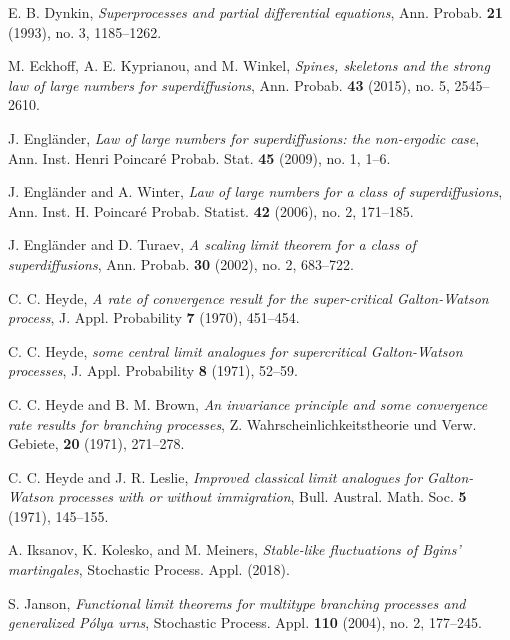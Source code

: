 \documentclass[12pt,a4paper]{amsart}
\theoremstyle{plain}
\theoremstyle{definition}
\numberwithin{equation}{section}
\begin{document}
\begin{thebibliography}{10}
  E. B. Dynkin,
  \emph{Superprocesses and partial differential equations},
  Ann. Probab. \textbf{21} (1993), no. 3, 1185--1262.

  M. Eckhoff, A. E. Kyprianou, and M. Winkel,
  \emph{Spines, skeletons and the strong law of large numbers for superdiffusions},
  Ann. Probab. \textbf{43} (2015), no. 5, 2545--2610.

  J. Engl\"{a}nder,
  \emph{Law of large numbers for superdiffusions: the non-ergodic case},
  Ann. Inst. Henri Poincar\'{e} Probab. Stat. \textbf{45} (2009), no. 1, 1--6.

  J. Engl\"{a}nder and A. Winter,
  \emph{Law of large numbers for a class of superdiffusions},
  Ann. Inst. H. Poincar\'{e} Probab. Statist. \textbf{42} (2006), no. 2, 171--185.

  J. Engl\"{a}nder and  D. Turaev,
  \emph{A scaling limit theorem for a class of superdiffusions},
  Ann. Probab. \textbf{30} (2002), no. 2, 683--722.

  C. C. Heyde,
  \emph{A rate of convergence result for the super-critical {G}alton-{W}atson process},
  J. Appl. Probability \textbf{7} (1970), 451--454.

  C. C. Heyde,
    \emph{some central limit analogues for supercritical {G}alton-{W}atson processes},
  J. Appl. Probability \textbf{8} (1971), 52--59.

  C. C. Heyde and B. M. Brown,
  \emph{An invariance principle and some convergence rate results for branching processes},
  Z. Wahrscheinlichkeitstheorie und Verw. Gebiete, \textbf{20} (1971), 271--278.

  C. C. Heyde and J. R. Leslie,
  \emph{Improved classical limit analogues for {G}alton-{W}atson processes with or without immigration},
  Bull. Austral. Math. Soc. \textbf{5} (1971), 145--155.

  A. Iksanov, K. Kolesko, and M. Meiners,
  \emph{Stable-like fluctuations of {B}gins' martingales},
  Stochastic Process. Appl. (2018).

  S. Janson,
  \emph{Functional limit theorems for multitype branching processes and generalized {P}\'{o}lya urns},
  Stochastic Process. Appl. \textbf{110} (2004), no. 2, 177--245.


\end{thebibliography}
\end{document}
